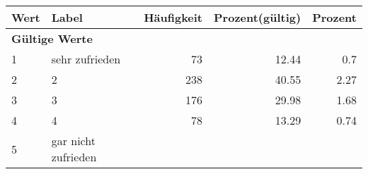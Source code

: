      \begin{longtable}{lXrrr}
     \toprule
     \textbf{Wert} & \textbf{Label} & \textbf{Häufigkeit} & \textbf{Prozent(gültig)} & \textbf{Prozent} \\
     \endhead
     \midrule
     \multicolumn{5}{l}{\textbf{Gültige Werte}}\\

     1 &
     \multicolumn{1}{X}{ sehr zufrieden   } &


       \num{73} &
       \num[round-mode=places,round-precision=2]{12,44} &
         \num[round-mode=places,round-precision=2]{0,7} \\

     2 &
     \multicolumn{1}{X}{ 2   } &


       \num{238} &
       \num[round-mode=places,round-precision=2]{40,55} &
         \num[round-mode=places,round-precision=2]{2,27} \\

     3 &
     \multicolumn{1}{X}{ 3   } &


       \num{176} &
       \num[round-mode=places,round-precision=2]{29,98} &
         \num[round-mode=places,round-precision=2]{1,68} \\

     4 &
     \multicolumn{1}{X}{ 4   } &


       \num{78} &
       \num[round-mode=places,round-precision=2]{13,29} &
         \num[round-mode=places,round-precision=2]{0,74} \\

     5 &
     \multicolumn{1}{X}{ gar nicht zufrieden   } &



\end{longtable}
